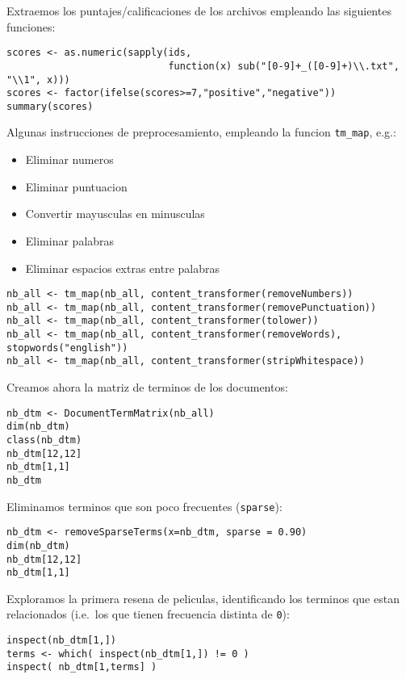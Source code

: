 \documentclass[11pt,]{article}
\begin{document}
Extraemos los puntajes/calificaciones de los archivos empleando las
siguientes funciones:

\begin{verbatim}
scores <- as.numeric(sapply(ids, 
                            function(x) sub("[0-9]+_([0-9]+)\\.txt", "\\1", x)))
scores <- factor(ifelse(scores>=7,"positive","negative"))
summary(scores)
\end{verbatim}

Algunas instrucciones de preprocesamiento, empleando la funcion
\texttt{tm\_map}, e.g.:

\begin{itemize}
\item
  Eliminar numeros
\item
  Eliminar puntuacion
\item
  Convertir mayusculas en minusculas
\item
  Eliminar palabras
\item
  Eliminar espacios extras entre palabras
\end{itemize}

\begin{verbatim}
nb_all <- tm_map(nb_all, content_transformer(removeNumbers))
nb_all <- tm_map(nb_all, content_transformer(removePunctuation))
nb_all <- tm_map(nb_all, content_transformer(tolower))
nb_all <- tm_map(nb_all, content_transformer(removeWords), stopwords("english"))
nb_all <- tm_map(nb_all, content_transformer(stripWhitespace))
\end{verbatim}

Creamos ahora la matriz de terminos de los documentos:

\begin{verbatim}
nb_dtm <- DocumentTermMatrix(nb_all)
dim(nb_dtm)
class(nb_dtm)
nb_dtm[12,12]
nb_dtm[1,1]
nb_dtm
\end{verbatim}

Eliminamos terminos que son poco frecuentes (\texttt{sparse}):

\begin{verbatim}
nb_dtm <- removeSparseTerms(x=nb_dtm, sparse = 0.90)
dim(nb_dtm)
nb_dtm[12,12]
nb_dtm[1,1]
\end{verbatim}

Exploramos la primera resena de peliculas, identificando los terminos
que estan relacionados (i.e.~los que tienen frecuencia distinta de
\texttt{0}):

\begin{verbatim}
inspect(nb_dtm[1,]) 
terms <- which( inspect(nb_dtm[1,]) != 0 )
inspect( nb_dtm[1,terms] )
\end{verbatim}
\end{document}
